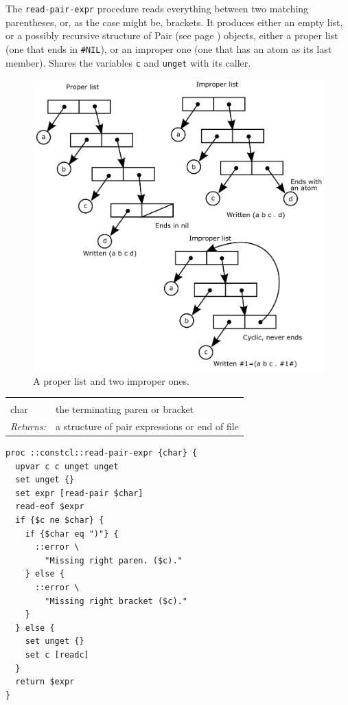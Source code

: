 \documentclass[twoside,9pt]{report}
\begin{document}
The \texttt{read-pair-expr} procedure reads everything between two matching parentheses, or, as the case might be, brackets. It produces either an empty list, or a possibly recursive structure of Pair (see page \pageref{pairs-and-lists}) objects, either a proper list (one that ends in \texttt{\#NIL}), or an improper one (one that has an atom as its last member). Shares the variables \texttt{c} and \texttt{unget} with its caller.

\begin{figure}[h!]\includegraphics{images/prop-improp.png}\captionsetup{labelformat=empty}\caption{ A proper list and two improper ones.}\label{fig:-a-proper-list-and-two-improper-ones}\end{figure}
\noindent\begin{tabular}{ |p{1.9cm} p{8cm}| }
\hline
\rowcolor[HTML]{CCCCCC} \multicolumn{2}{|l|}{\bf read-pair-expr (internal)} \\
char & the terminating paren or bracket \\
\textit{Returns:} & a structure of pair expressions or end of file \\
\hline
\end{tabular}
\begin{lstlisting}
proc ::constcl::read-pair-expr {char} {
  upvar c c unget unget
  set unget {}
  set expr [read-pair $char]
  read-eof $expr
  if {$c ne $char} {
    if {$char eq ")"} {
      ::error \
        "Missing right paren. ($c)."
    } else {
      ::error \
        "Missing right bracket ($c)."
    }
  } else {
    set unget {}
    set c [readc]
  }
  return $expr
}
\end{lstlisting}
\end{document}
